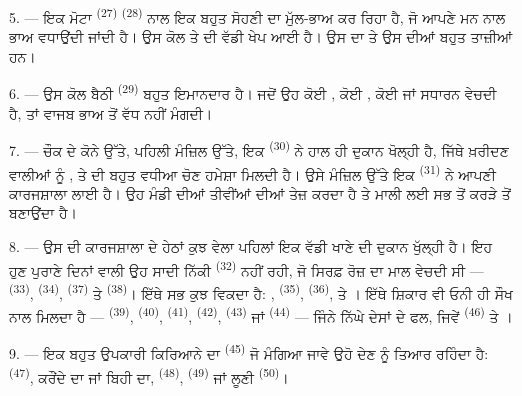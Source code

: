 5. --- ਇਕ ਮੋਟਾ  \textsuperscript{(27)} 
\textsuperscript{(28)} ਨਾਲ ਇਕ ਬਹੁਤ ਸੋਹਣੀ  ਦਾ ਮੁੱਲ-ਭਾਅ ਕਰ ਰਿਹਾ ਹੈ, ਜੋ
ਆਪਣੇ ਮਨ ਨਾਲ ਭਾਅ ਵਧਾਉਂਦੀ ਜਾਂਦੀ ਹੈ। ਉਸ ਕੋਲ  ਤੇ
 ਦੀ ਵੱਡੀ ਖੇਪ ਆਈ ਹੈ। ਉਸ ਦਾ  ਤੇ ਉਸ ਦੀਆਂ 
ਬਹੁਤ ਤਾਜ਼ੀਆਂ ਹਨ।

\VUsaut{4.0mm}
\VUsaut{3.0mm}

6. --- ਉਸ ਕੋਲ ਬੈਠੀ  \textsuperscript{(29)} ਬਹੁਤ ਇਮਾਨਦਾਰ
ਹੈ। ਜਦੋਂ ਉਹ ਕੋਈ , ਕੋਈ , ਕੋਈ  ਜਾਂ ਸਧਾਰਨ
 ਵੇਚਦੀ ਹੈ, ਤਾਂ ਵਾਜਬ ਭਾਅ ਤੋਂ ਵੱਧ ਨਹੀਂ ਮੰਗਦੀ।

7. --- ਚੌਕ ਦੇ ਕੋਨੇ ਉੱਤੇ, ਪਹਿਲੀ ਮੰਜ਼ਿਲ ਉੱਤੇ, ਇਕ 
\textsuperscript{(30)} ਨੇ ਹਾਲ ਹੀ ਦੁਕਾਨ ਖੋਲ੍ਹੀ ਹੈ, ਜਿੱਥੇ ਖ਼ਰੀਦਣ ਵਾਲੀਆਂ ਨੂੰ
,  ਤੇ  ਦੀ ਬਹੁਤ ਵਧੀਆ ਚੋਣ
ਹਮੇਸ਼ਾ ਮਿਲਦੀ ਹੈ। ਉਸੇ ਮੰਜ਼ਿਲ ਉੱਤੇ ਇਕ  \textsuperscript{(31)}
ਨੇ ਆਪਣੀ ਕਾਰਜਸ਼ਾਲਾ ਲਾਈ ਹੈ। ਉਹ ਮੰਡੀ ਦੀਆਂ ਤੀਵੀਂਆਂ ਦੀਆਂ  ਤੇਜ਼ ਕਰਦਾ ਹੈ
ਤੇ ਮਾਲੀ ਲਈ ਸਭ ਤੋਂ ਕਰੜੇ  ਤੋਂ  ਬਣਾਉਂਦਾ
ਹੈ।

\VUsaut{4.0mm}
\VUsaut{3.0mm}

8. --- ਉਸ ਦੀ ਕਾਰਜਸ਼ਾਲਾ ਦੇ ਹੇਠਾਂ ਕੁਝ ਵੇਲਾ ਪਹਿਲਾਂ ਇਕ ਵੱਡੀ ਖਾਣੇ ਦੀ ਦੁਕਾਨ ਖੁੱਲ੍ਹੀ ਹੈ।
ਇਹ ਹੁਣ ਪੁਰਾਣੇ ਦਿਨਾਂ ਵਾਲੀ ਉਹ ਸਾਦੀ ਨਿੱਕੀ 
\textsuperscript{(32)} ਨਹੀਂ ਰਹੀ, ਜੋ ਸਿਰਫ਼ ਰੋਜ਼ ਦਾ ਮਾਲ ਵੇਚਦੀ ਸੀ — 
\textsuperscript{(33)},  \textsuperscript{(34)},
 \textsuperscript{(37)} ਤੇ  \textsuperscript{(38)}।
ਇੱਥੇ ਸਭ ਕੁਝ ਵਿਕਦਾ ਹੈ: , 
\textsuperscript{(35)},  \textsuperscript{(36)},  ਤੇ । ਇੱਥੇ ਸ਼ਿਕਾਰ ਵੀ ਓਨੀ ਹੀ ਸੌਖ ਨਾਲ ਮਿਲਦਾ ਹੈ —
 \textsuperscript{(39)},  \textsuperscript{(40)},
 \textsuperscript{(41)},  \textsuperscript{(42)},
 \textsuperscript{(43)} ਜਾਂ 
\textsuperscript{(44)} — ਜਿੰਨੇ ਨਿੱਘੇ ਦੇਸਾਂ ਦੇ ਫਲ, ਜਿਵੇਂ 
\textsuperscript{(46)} ਤੇ ।

9. --- ਇਕ ਬਹੁਤ ਉਪਕਾਰੀ ਕਿਰਿਆਨੇ ਦਾ  \textsuperscript{(45)} ਜੋ ਮੰਗਿਆ
ਜਾਵੇ ਉਹੋ ਦੇਣ ਨੂੰ ਤਿਆਰ ਰਹਿੰਦਾ ਹੈ:  \textsuperscript{(47)}, ਕਰੌਂਦੇ
ਦਾ ਜਾਂ ਬਿਹੀ ਦਾ,  \textsuperscript{(48)}, 
\textsuperscript{(49)} ਜਾਂ ਲੂਣੀ  \textsuperscript{(50)}।

